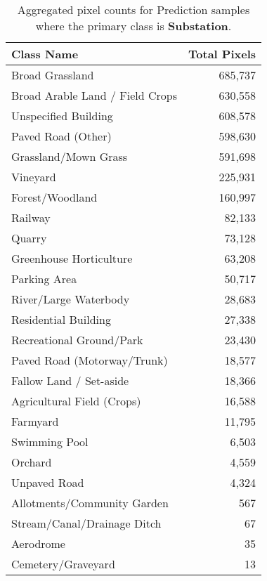 \begin{table}[H] %
    \centering
    \caption{Aggregated pixel counts for Prediction samples where the primary class is \textbf{Substation}.}
    \label{tab:pred_counts_29}
    \begin{tabular}{lr}
        \hline
        \textbf{Class Name} & \textbf{Total Pixels} \\
        \hline
        Broad Grassland & 685,737 \\
        Broad Arable Land / Field Crops & 630,558 \\
        Unspecified Building & 608,578 \\
        Paved Road (Other) & 598,630 \\
        Grassland/Mown Grass & 591,698 \\
        Vineyard & 225,931 \\
        Forest/Woodland & 160,997 \\
        Railway & 82,133 \\
        Quarry & 73,128 \\
        Greenhouse Horticulture & 63,208 \\
        Parking Area & 50,717 \\
        River/Large Waterbody & 28,683 \\
        Residential Building & 27,338 \\
        Recreational Ground/Park & 23,430 \\
        Paved Road (Motorway/Trunk) & 18,577 \\
        Fallow Land / Set-aside & 18,366 \\
        Agricultural Field (Crops) & 16,588 \\
        Farmyard & 11,795 \\
        Swimming Pool & 6,503 \\
        Orchard & 4,559 \\
        Unpaved Road & 4,324 \\
        Allotments/Community Garden & 567 \\
        Stream/Canal/Drainage Ditch & 67 \\
        Aerodrome & 35 \\
        Cemetery/Graveyard & 13 \\
        \hline
    \end{tabular}
\end{table}

